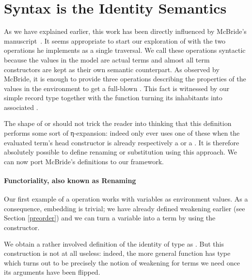 \section{Syntax is the Identity Semantics}

As we have explained earlier, this work has been directly influenced by
McBride's manuscript~\cite{mcbride2005type}. It seems appropriate
to start our exploration of  with the two operations he
implements as a single traversal. We call these operations syntactic
because the values in the model are actual terms and almost all term
constructors are kept as their own semantic counterpart. As observed by
McBride, it is enough to provide three operations describing the properties
of the values in the environment to get a full-blown . This
fact is witnessed by our simple  record type together with
the  function turning its inhabitants into associated
.


The shape of  or  should not trick the reader
into thinking that this definition performs some sort of η-expansion:
 indeed only ever uses one of these when the evaluated term's
head constructor is already respectively a  or a .
It is therefore absolutely possible to define renaming or substitution
using this approach. We can now port McBride's definitions to our
framework.

\paragraph{Functoriality, also known as Renaming}
Our first example of a  operation works with variables as
environment values. As a consequence, embedding is trivial; we have already
defined weakening earlier (see Section \ref{preorder}) and we can turn
a variable into a term by using the  constructor.


We obtain a rather involved definition of the identity of type 
      as  .
But this construction is not at all useless: indeed, the more general
  function has type    
       which turns out to be
precisely the notion of weakening for terms we need once its arguments
have been flipped.

